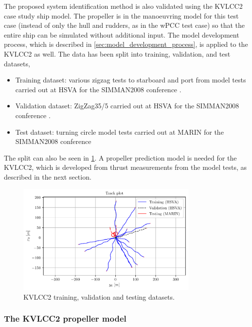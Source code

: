 The proposed system identification method is also validated using the KVLCC2 case study ship model.
The propeller is in the manoeuvring model for this test case (instead of only the hull and rudders, as in the wPCC test case) so that the entire ship can be simulated without additional input.
The model development process, which is described in \autoref{sec:model_development_process}, is applied to the KVLCC2 as well.
The data has been split into training, validation, and test datasets,
\begin{itemize}
    \item Training dataset: various zigzag tests to starboard and port from model tests carried out at HSVA for the SIMMAN2008 conference \cite{stern_experience_2011}.
    \item Validation dataset: ZigZag35/5 carried out at HSVA for the SIMMAN2008 conference \cite{stern_experience_2011}.
    \item Test dataset: turning circle model tests carried out at MARIN for the SIMMAN2008 conference \cite{stern_experience_2011}
\end{itemize}
\noindent The split can also be seen in \ref{fig:kvlcc2_datasets}. A propeller prediction model is needed for the KVLCC2, which is developed from thrust measurements from the model tests, as described in the next section.

\begin{figure}[h!]
\centering
\includegraphics[width=0.8\textwidth]{kappa/images/4.pdf}
\caption{KVLCC2 training, validation and testing datasets.}\label{fig:kvlcc2_datasets}\end{figure}

\newpage
\subsubsection{The KVLCC2 propeller model}
\label{\detokenize{06.20_results_kvlcc2:the-kvlcc2-propeller-model}}\label{\detokenize{06.20_results_kvlcc2:results-propeller-model}}


